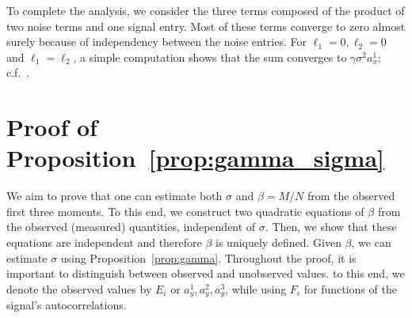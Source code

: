 \documentclass[english,11pt]{article}
\numberwithin{equation}{section}
\theoremstyle{plain}
\theoremstyle{definition}
\theoremstyle{remark}
\theoremstyle{plain}
\theoremstyle{remark}
\theoremstyle{plain}
\theoremstyle{plain}
\begin{document}
To complete the analysis, we consider the three terms composed of the product of two noise terms and one signal entry. Most of these terms converge to zero almost surely because of independency between the noise entries. For $\ell_1=0, \ell_2=0$ and $\ell_1=\ell_2$,  a simple computation shows that the sum converges to $\gamma\sigma^2a_x^1$; c.f.~\cite{boumal2017heterogeneous}.



\section{Proof of Proposition~\ref{prop:gamma_sigma}} \label{sec:proof_prop_gamma_sigma}

We aim to prove that one can estimate both $\sigma$ and $\beta = M/N$ from the observed first three moments.
To this end, we construct two quadratic equations of $\beta$ from the observed (measured) quantities, independent of $\sigma$.
Then, we show that these equations are independent and therefore $\beta$ is uniquely defined. 
Given $\beta$, we can estimate $\sigma$ using Proposition~\ref{prop:gamma}.
Throughout the proof, it is important to distinguish between observed and unobserved values. 
to this end, we denote the observed values by $E_i$ or $a_y^1,a_y^2,a_y^3$, while using $F_i$ for functions of the signal's autocorrelations. 
\end{document}
